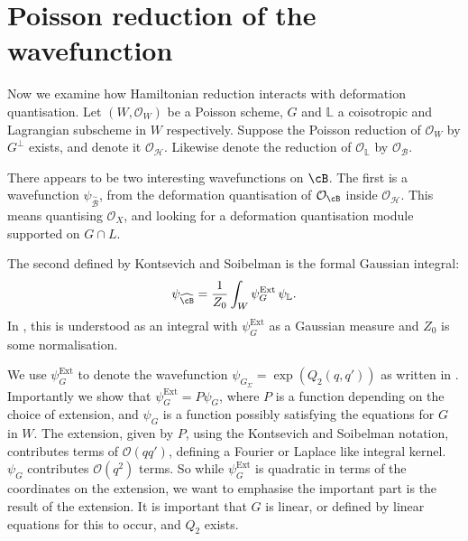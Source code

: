 
    \section{Poisson reduction of the wavefunction}
    \label{section:wavefunction_reduction}
    
    Now we examine how Hamiltonian reduction interacts with deformation quantisation.  Let \( (W,\mathcal{O}_W)\) be a Poisson scheme, \(G\) and \( \mathbb{L}\) a coisotropic and Lagrangian subscheme in \(W\) respectively. Suppose the Poisson reduction of \( \mathcal{O}_W\) by \(G^{\perp}\) exists, and denote it \( \mathcal{O}_{\mathcal{H}}\). Likewise denote the reduction of \( \mathcal{O}_{\mathbb{L}}\) by \( \mathcal{O}_{\mathcal{B}}\).
    
    
    There appears to be two interesting wavefunctions on \( \cB\). The first is a wavefunction \( \psi_{\overset{\sim}{\mathcal{B}}}\), from the deformation quantisation of  \(\mathcal{O}_{\cB}\) inside \( \mathcal{O}_\mathcal{H}\). This means quantising \( \mathcal{O}_X\), and looking for a deformation quantisation module supported on \( G \cap L\).
    
    The second defined by Kontsevich and Soibelman is the formal Gaussian integral: 
    \[ \psi_{\widehat{\cB}} = \frac{1}{Z_0} \int_{W} \psi_G^{\text{Ext}}  \,  \psi_{\mathbb{L}} . \]
    In \cite[page 53]{ks_airy}, this is understood as an integral with \(\psi_G^{\text{Ext}}\) as a Gaussian measure and \(Z_0\) is some normalisation. 

    \begin{rem}
    We use \( \psi_G^{\mathrm{Ext}}\) to denote the wavefunction \(  \psi_{G_\Sigma} =\exp(Q_2(q,q')) \) as written in \cite[page 53]{ks_airy}. Importantly we show that \( \psi_{G}^{\mathrm{Ext}} = P \psi_G\), where \(P\) is a function depending on the choice of extension, and \( \psi_G\) is a function possibly satisfying the equations for \(G\) in \(W\). The extension, given by \(P\), using the Kontsevich and Soibelman notation, contributes terms of \( \mathcal{O}( q q')\), defining a Fourier or Laplace like integral kernel. \( \psi_G\) contributes \(\mathcal{O}(q^2)\) terms. So while \( \psi_G^{\mathrm{Ext}}\) is quadratic in terms of the coordinates on the extension, we want to emphasise the important part is the result of the extension. It is important that \(G\) is linear, or defined by linear equations for this to occur, and \(Q_2\) exists.
    \end{rem}
    
